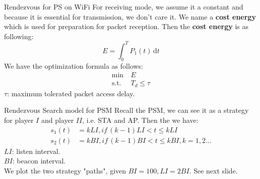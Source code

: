 \documentclass[10pt]{beamer}
\begin{document}
    \begin{frame}{Rendezvous for PS on WiFi}
        For receiving mode, we assume it a constant and because it is essential for transmission, we don't care it. We name a \textbf{cost energy} which is used for preparation for packet reception. 
        Then the \textbf{cost energy} is as following:
        \begin{equation}
            \label{CostEnergy}
            E = \int_0^T P_1(t)\,\mathrm{d}t %
        \end{equation} 
        We have the optimization formula as follows:
        \begin{equation}
            \label{OptimizationFormula}
            \begin{split}
                \min\ & E \\
                \textrm{s.t.} & T_d \leq \tau
            \end{split}
        \end{equation}
        $\tau$: maximum tolerated packet access delay. 
    \end{frame}

    \begin{frame}{Rendezvous Search model for PSM}
        Recall the PSM, we can see it as a strategy for player $I$ and player $II$, i.e. STA and AP. Then the we have: 
        \begin{equation}
            \label{ConcreteStrategy}
            \begin{split}
                s_1(t) &= kLI, if \, (k-1)LI < t \leq kLI \\
                s_2(t) &= kBI, if \, (k-1)BI < t \leq kBI, k = 1,2...
            \end{split}
        \end{equation}
        $LI$: listen interval. \\
        $BI$: beacon interval. \\
        We plot the two strategy "paths", given $BI = 100, LI = 2BI$. See next slide. 
    \end{frame}
\end{document}
